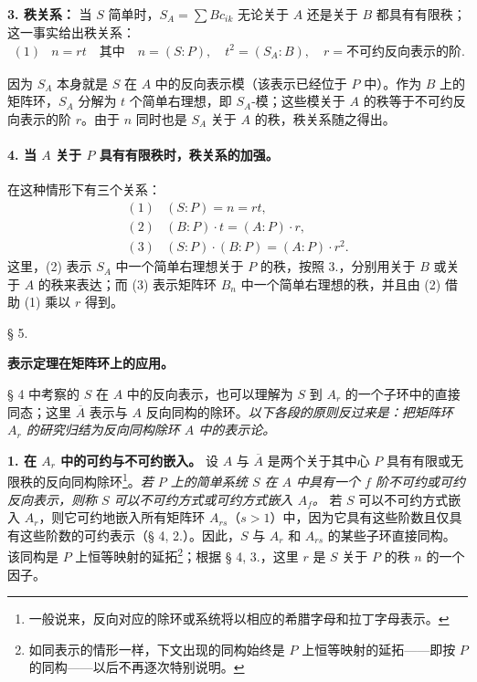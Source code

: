 \documentclass[11pt]{article}
\begin{document}
\noindent\textbf{3. 秩关系：} 当 \(S\) 简单时，\(S_A=\sum Bc_{ik}\) 无论关于 \(A\) 还是关于 \(B\) 都具有有限秩；这一事实给出秩关系：
\[
\begin{array}{rl}
(1)& n=rt\quad\text{其中}\quad n=(S:P),\quad t^2=(S_A:B),\quad r=\text{不可约反向表示的阶}.
\end{array}
\]

因为 \(S_A\) 本身就是 \(S\) 在 \(A\) 中的反向表示模（该表示已经位于 \(P\) 中）。作为 \(B\) 上的矩阵环，\(S_A\) 分解为 \(t\) 个简单右理想，即 \(S_A\)-模；这些模关于 \(A\) 的秩等于不可约反向表示的阶 \(r\)。由于 \(n\) 同时也是 \(S_A\) 关于 \(A\) 的秩，秩关系随之得出。

\paragraph{4. 当 \(A\) 关于 \(P\) 具有有限秩时，秩关系的加强。}
在这种情形下有三个关系：
\[
\begin{array}{rl}
(1)& (S:P)=n=rt,\\
(2)& (B:P)\cdot t=(A:P)\cdot r,\\
(3)& (S:P)\cdot(B:P)=(A:P)\cdot r^2.
\end{array}
\]
这里，(2) 表示 \(S_A\) 中一个简单右理想关于 \(P\) 的秩，按照 3.，分别用关于 \(B\) 或关于 \(A\) 的秩来表达；而 (3) 表示矩阵环 \(B_n\) 中一个简单右理想的秩，并且由 (2) 借助 (1) 乘以 \(r\) 得到。

\begin{center}
§ 5.

\textbf{表示定理在矩阵环上的应用。}
\end{center}

§ 4 中考察的 \(S\) 在 \(A\) 中的反向表示，也可以理解为 \(S\) 到 \(A_r\) 的一个子环中的直接同态；这里 \(\overline A\) 表示与 \(A\) 反向同构的除环。\emph{以下各段的原则反过来是：把矩阵环 \(A_r\) 的研究归结为反向同构除环 \(A\) 中的表示论。}

\noindent\textbf{1. 在 \(A_r\) 中的可约与不可约嵌入。} 设 \(A\) 与 \(\overline A\) 是两个关于其中心 \(P\) 具有有限或无限秩的反向同构除环\footnote{一般说来，反向对应的除环或系统将以相应的希腊字母和拉丁字母表示。}。\emph{若 \(P\) 上的简单系统 \(S\) 在 \(A\) 中具有一个 \(f\) 阶不可约或可约反向表示，则称 \(S\) 可以不可约方式或可约方式嵌入 \(A_f\)。} 若 \(S\) 可以不可约方式嵌入 \(A_r\)，则它可约地嵌入所有矩阵环 \(A_{rs}\)（\(s>1\)）中，因为它具有这些阶数且仅具有这些阶数的可约表示（§ 4, 2.）。因此，\(S\) 与 \(A_r\) 和 \(A_{rs}\) 的某些子环直接同构。该同构是 \(P\) 上恒等映射的延拓\footnote{如同表示的情形一样，下文出现的同构始终是 \(P\) 上恒等映射的延拓——即按 \(P\) 的同构——以后不再逐次特别说明。}；根据 § 4, 3.，这里 \(r\) 是 \(S\) 关于 \(P\) 的秩 \(n\) 的一个因子。
\end{document}
